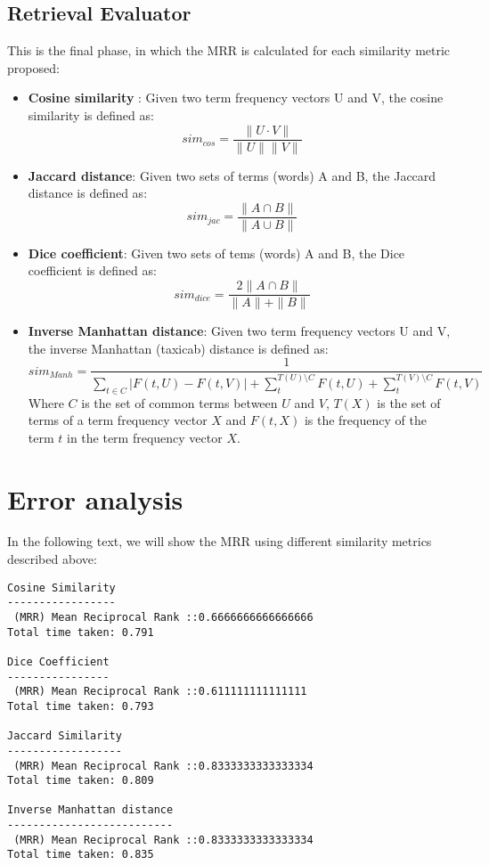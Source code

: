 \documentclass{article}
\begin{document}
\subsection{Retrieval Evaluator}
This is the final phase, in which the MRR  is calculated for each similarity metric proposed: 
\begin{itemize}
\item{ \textbf{Cosine similarity} : Given two term frequency vectors U and V, the cosine similarity is defined as:
\begin{equation}
sim_{cos} = \frac{ \| U \cdot V \| }{ \| U \| \| V \| }
\end{equation}
}
\item{ \textbf{Jaccard distance}: Given two sets of terms (words) A and B, the Jaccard distance is defined as: 
\begin{equation}
sim_{jac} = \frac{ \| A \cap B \| }{ \| A \cup B \| }
\end{equation}
}
\item{ \textbf{Dice coefficient}: Given two sets of tems (words) A and B, the Dice coefficient is defined as:
\begin{equation}
sim_{dice} = \frac{ 2 \| A \cap B \| }{ \|A\| + \|B\|  }
\end{equation}
}
\item{ \textbf{Inverse Manhattan distance}: Given two term frequency vectors U and V, the inverse Manhattan (taxicab) distance is defined as:
\begin{equation}
sim_{Manh} = \frac{1}{ \sum_{t \in C} | F(t, U) - F(t, V) | + \sum_{t}^{T(U) \setminus C} F(t,U) + \sum_{t}^{T(V) \setminus C } F(t,V)  }
\end{equation}
Where $C$ is the set of common terms between $U$ and $V$, $T(X)$ is the set of terms of a term frequency vector $X$ and $F(t,X)$ is the frequency of the term $t$ in the term frequency vector $X$.
}

\end{itemize}

\section{Error analysis}
In the following text, we will show the MRR using different similarity metrics described above:
\begin{verbatim}
Cosine Similarity
-----------------
 (MRR) Mean Reciprocal Rank ::0.6666666666666666
Total time taken: 0.791

Dice Coefficient
----------------
 (MRR) Mean Reciprocal Rank ::0.611111111111111
Total time taken: 0.793

Jaccard Similarity
------------------
 (MRR) Mean Reciprocal Rank ::0.8333333333333334
Total time taken: 0.809

Inverse Manhattan distance
--------------------------
 (MRR) Mean Reciprocal Rank ::0.8333333333333334
Total time taken: 0.835
\end{verbatim}
\end{document}
